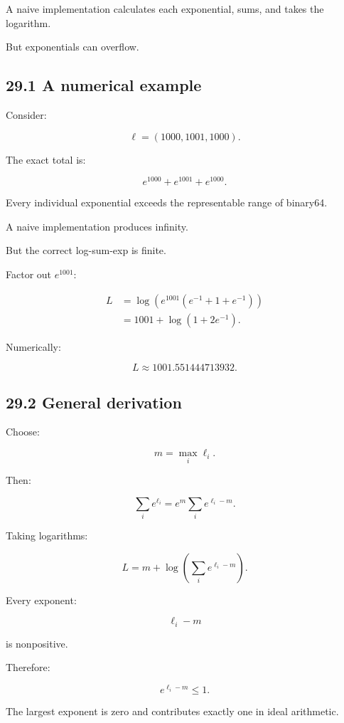 A naive implementation calculates each exponential, sums, and takes the logarithm.

But exponentials can overflow.

\subsection{29.1 A numerical example}\label{02-foundations-ii-ch031-a-numerical-example}

Consider:

\[ \ell=(1000,1001,1000). \]

The exact total is:

\[ e^{1000}+e^{1001}+e^{1000}. \]

Every individual exponential exceeds the representable range of binary64.

A naive implementation produces infinity.

But the correct log-sum-exp is finite.

Factor out \(e^{1001}\):

\[ \begin{aligned} L &= \log\left( e^{1001} (e^{-1}+1+e^{-1}) \right)\\ &= 1001+\log(1+2e^{-1}). \end{aligned} \]

Numerically:

\[ \boxed{ L\approx1001.551444713932 }. \]

\subsection{29.2 General derivation}\label{02-foundations-ii-ch031-general-derivation}

Choose:

\[ m=\max_i\ell_i. \]

Then:

\[ \sum_ie^{\ell_i} = e^m\sum_ie^{\ell_i-m}. \]

Taking logarithms:

\[ \boxed{ L= m+\log\left( \sum_ie^{\ell_i-m} \right) }. \]

Every exponent:

\[ \ell_i-m \]

is nonpositive.

Therefore:

\[ e^{\ell_i-m}\le1. \]

The largest exponent is zero and contributes exactly one in ideal arithmetic.

